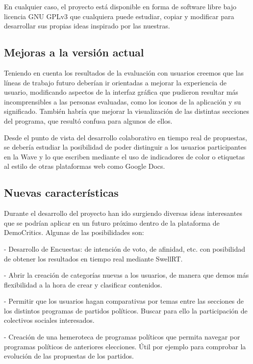 En cualquier caso, el proyecto está disponible en forma de software libre bajo licencia GNU GPLv3 que cualquiera puede estudiar, copiar y modificar para desarrollar sus propias ideas inspirado por las nuestras. 

\subsection{Mejoras a la versión actual}

Teniendo en cuenta los resultados de la evaluación con usuarios creemos que las líneas de trabajo futuro deberían ir orientadas a mejorar la experiencia de usuario, modificando aspectos de la interfaz gráfica que pudieron resultar más incomprensibles a las personas evaluadas, como los iconos de la aplicación y su significado. También habría que mejorar la visualización de las distintas secciones del programa, que resultó confusa para algunos de ellos. 

Desde el punto de vista del desarrollo colaborativo en tiempo real de propuestas, se debería estudiar la posibilidad de poder distinguir a los usuarios participantes en la Wave y lo que escriben mediante el uso de indicadores de color o etiquetas al estilo de otras plataformas web como Google Docs. 

\subsection{Nuevas características}

Durante el desarrollo del proyecto han ido surgiendo diversas ideas interesantes que se podrían aplicar en un futuro próximo dentro de la plataforma de DemoCritics. Algunas de las posibilidades son:

- Desarrollo de Encuestas: de intención de voto, de afinidad, etc. con posibilidad de obtener los resultados en tiempo real mediante SwellRT.

- Abrir la creación de categorías nuevas a los usuarios, de manera que demos más flexibilidad a la hora de crear y clasificar contenidos.

- Permitir que los usuarios hagan comparativas por temas entre las secciones de los distintos programas de partidos políticos. Buscar para ello la participación de colectivos sociales interesados.  

- Creación de una hemeroteca de programas políticos que permita navegar por programas políticos de anteriores elecciones. Útil por ejemplo para comprobar la evolución de las propuestas de los partidos.


